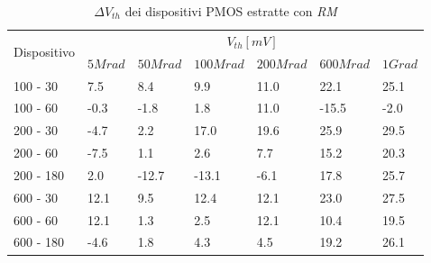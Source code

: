 \documentclass[12pt, letterpaper]{book}
\begin{document}
\begin{table}[H]
  \renewcommand{\arraystretch}{1.3}
    \begin{tabular}{m{2cm}  m{1.1cm} m{1.3cm} m{1.5cm} m{1.5cm} m{1.5cm} m{1cm}}
      \toprule
      \multirow{2}{*}{Dispositivo} & \multicolumn{6}{c}{$V_{th} [mV] $}                                                                    \\
      \cmidrule{2-7}
                                   & $5Mrad$ & $50Mrad$ & $100Mrad$ & $200Mrad$ & $600Mrad$ & $1Grad$ \\
      \midrule
	100 - 30				& 7.5		& 8.4		& 9.9		& 11.0		& 22.1		&  25.1  \\
      \hline
      100 - 60				& -0.3		& -1.8		& 1.8		& 11.0 		& -15.5		& -2.0    \\
      \hline
      200 - 30				&-4.7 		& 2.2		& 17.0		& 19.6		& 25.9 		& 29.5   \\
      \hline
      200 - 60				& -7.5		& 1.1		& 2.6		& 7.7		& 15.2		& 20.3  \\
      \hline
      200 - 180				& 2.0		& -12.7		& -13.1		& -6.1		& 17.8		& 25.7  \\
      \hline
      600 - 30				& 12.1		& 9.5		& 12.4		& 12.1		& 23.0		& 27.5   \\
      \hline
      600 - 60				& 12.1		& 1.3		&2.5 		& 12.1		& 10.4		&19.5  \\
      \hline
      600 - 180				& -4.6		& 1.8		& 4.3		& 4.5		& 19.2		& 26.1   \\
      \bottomrule
    \end{tabular}
  \caption{$\Delta V_{th}$ dei dispositivi PMOS estratte con \emph{RM}}
  \label{tab:deltaVthRMP}
\end{table}
\end{document}
